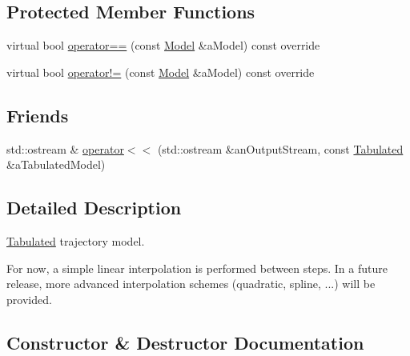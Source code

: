 \subsection*{Protected Member Functions}
\begin{DoxyCompactItemize}
\item 
virtual bool \hyperlink{classlibrary_1_1astro_1_1trajectory_1_1models_1_1_tabulated_af733fafd705bd6a1f204acdbaf2e9646}{operator==} (const \hyperlink{classlibrary_1_1astro_1_1trajectory_1_1_model}{Model} \&a\+Model) const override
\item 
virtual bool \hyperlink{classlibrary_1_1astro_1_1trajectory_1_1models_1_1_tabulated_ae6b286af87f28d080b523fb879b74109}{operator!=} (const \hyperlink{classlibrary_1_1astro_1_1trajectory_1_1_model}{Model} \&a\+Model) const override
\end{DoxyCompactItemize}
\subsection*{Friends}
\begin{DoxyCompactItemize}
\item 
std\+::ostream \& \hyperlink{classlibrary_1_1astro_1_1trajectory_1_1models_1_1_tabulated_af2b779226be02822defbe40cf6d3c4b8}{operator$<$$<$} (std\+::ostream \&an\+Output\+Stream, const \hyperlink{classlibrary_1_1astro_1_1trajectory_1_1models_1_1_tabulated}{Tabulated} \&a\+Tabulated\+Model)
\end{DoxyCompactItemize}


\subsection{Detailed Description}
\hyperlink{classlibrary_1_1astro_1_1trajectory_1_1models_1_1_tabulated}{Tabulated} trajectory model. 

For now, a simple linear interpolation is performed between steps. In a future release, more advanced interpolation schemes (quadratic, spline, ...) will be provided. 

\subsection{Constructor \& Destructor Documentation}
\mbox{\label{classlibrary_1_1astro_1_1trajectory_1_1models_1_1_tabulated_a01461e23723b83bed5dcdd9cac977d14}} 

